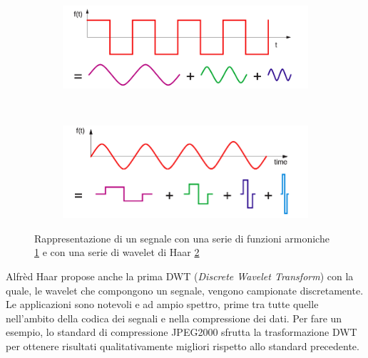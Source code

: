         \begin{figure}[h]
            \centering
            \begin{subfigure}[b]{0.48\textwidth}
            \includegraphics[width=\linewidth]{img/fourier_rapresentation.png}
                \caption{}
                \label{fig:fourier_rapresentation}
            \end{subfigure}
            ~ %
            \begin{subfigure}[b]{0.48\textwidth}
            \includegraphics[width=\linewidth]{img/haar_rapresentation.png}
                \caption{}
                \label{fig:wavelet_rapresentation}
            \end{subfigure}
            \caption{Rappresentazione di un segnale con una serie di funzioni armoniche \ref{fig:fourier_rapresentation} e con una serie di wavelet di Haar \ref{fig:wavelet_rapresentation}}
            \label{fig:signal_rapresentation}
        \end{figure}

        Alfrèd Haar propose anche la prima DWT (\emph{Discrete Wavelet Transform}) con la quale, le wavelet che compongono un segnale, vengono campionate discretamente.
        Le applicazioni sono notevoli e ad ampio spettro, prime tra tutte quelle nell'ambito della codica dei segnali e nella compressione dei dati. Per fare un esempio, lo standard di compressione JPEG2000 sfrutta la trasformazione DWT \cite{Jpeg2000} per ottenere risultati qualitativamente migliori rispetto allo standard precedente.

